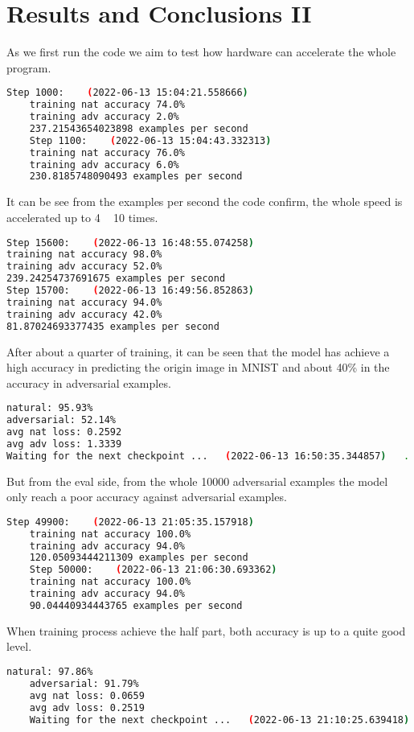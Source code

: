 \documentclass[
	letterpaper, %
	10pt, %
]{CSUniSchoolLabReport}
\begin{document}
\section{Results and Conclusions II}
As we first run the code we aim to test how hardware can accelerate the whole program.
\begin{lstlisting}[language=bash]
	Step 1000:    (2022-06-13 15:04:21.558666)
	training nat accuracy 74.0%
	training adv accuracy 2.0%
	237.21543654023898 examples per second
	Step 1100:    (2022-06-13 15:04:43.332313)
	training nat accuracy 76.0%
	training adv accuracy 6.0%
	230.8185748090493 examples per second
\end{lstlisting}
It can be see from the examples per second the code confirm, the whole speed is accelerated up to 4 ~ 10 times.
\begin{lstlisting}[language=bash]
Step 15600:    (2022-06-13 16:48:55.074258)
training nat accuracy 98.0%
training adv accuracy 52.0%
239.24254737691675 examples per second
Step 15700:    (2022-06-13 16:49:56.852863)
training nat accuracy 94.0%
training adv accuracy 42.0%
81.87024693377435 examples per second
\end{lstlisting}
After about a quarter of training, it can be seen that the model has achieve a high accuracy in predicting the origin image in MNIST and about 40\% in the accuracy in adversarial examples.
\begin{lstlisting}[language=bash]
natural: 95.93%
adversarial: 52.14%
avg nat loss: 0.2592
avg adv loss: 1.3339
Waiting for the next checkpoint ...   (2022-06-13 16:50:35.344857)   .
\end{lstlisting}
But from the eval side, from the whole 10000 adversarial examples the model only reach a poor accuracy against adversarial examples. 
\begin{lstlisting}[language=bash]
	Step 49900:    (2022-06-13 21:05:35.157918)
	training nat accuracy 100.0%
	training adv accuracy 94.0%
	120.05093444211309 examples per second
	Step 50000:    (2022-06-13 21:06:30.693362)
	training nat accuracy 100.0%
	training adv accuracy 94.0%
	90.04440934443765 examples per second
\end{lstlisting}
When training process achieve the half part, both accuracy is up to a quite good level.
\begin{lstlisting}[language=bash]
	natural: 97.86%
	adversarial: 91.79%
	avg nat loss: 0.0659
	avg adv loss: 0.2519
	Waiting for the next checkpoint ...   (2022-06-13 21:10:25.639418)   .
\end{lstlisting}
\end{document}
